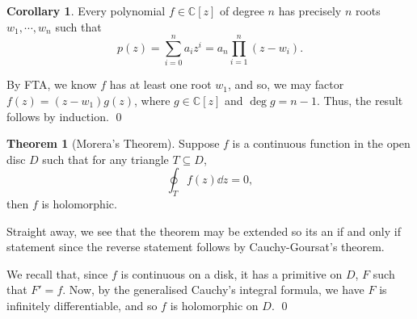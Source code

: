 \documentclass[
]{article}
\theoremstyle{definition}
\newtheorem{theorem}{Theorem}
\newtheorem{corollary}{Corollary}[theorem]
\theoremstyle{definition}
\begin{document}
\begin{corollary}
  Every polynomial \(f \in \mathbb{C}[z]\) of degree \(n\) has precisely 
  \(n\) roots \(w_1, \cdots, w_n\) such that 
  \[p(z) = \sum_{i = 0}^n a_i z^i = a_n\prod_{i = 1}^n (z - w_i).\]
\end{corollary}
\proof

By FTA, we know \(f\) has at least one root \(w_1\), and so, we may
factor \(f(z) = (z - w_1)g(z)\), where \(g \in \mathbb{C}[z]\) and
\(\deg g = n - 1\). Thus, the result follows by induction. \qed

\begin{theorem}[Morera's Theorem]
  Suppose \(f\) is a continuous function in the open disc \(D\) such that for any 
  triangle \(T \subseteq D\), 
  \[\oint_T f(z) \dd z = 0,\]
  then \(f\) is holomorphic.
\end{theorem}

Straight away, we see that the theorem may be extended so its an if and
only if statement since the reverse statement follows by
Cauchy-Goursat's theorem.

\proof

We recall that, since \(f\) is continuous on a disk, it has a primitive
on \(D\), \(F\) such that \(F' = f\). Now, by the generalised Cauchy's
integral formula, we have \(F\) is infinitely differentiable, and so
\(f\) is holomorphic on \(D\). \qed
\end{document}
